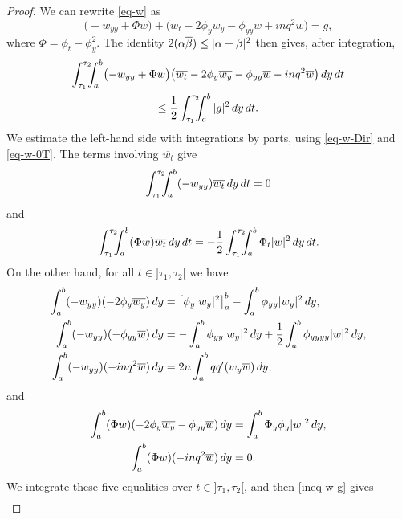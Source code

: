 \documentclass[10pt]{amsart}
\theoremstyle{plain}
\theoremstyle{definition}
\newcommand{\abs}[1]{\vert #1\vert}
\newcommand{\1}{\mathds 1}
\let\Re\relax
\DeclareMathOperator{\Re}{\mathsf{Re}\mkern2mu}
\let\Im\relax
\DeclareMathOperator{\Im}{\mathsf{Im}\mkern2mu}
\let\a\alpha
\let\b\beta
\begin{document}
\begin{proof}
We can rewrite \eqref{eq-w} as
\begin{equation*} \label{eq-g}
\bigl(- w_{yy} + \Phi w \bigr) + \bigl(w_t - 2 \phi_y w_y - \phi_{yy} w + i n q^2 w \bigr) = g,
\end{equation*}
where $\Phi = \phi_t - \phi_y^2$.
The identity $2\Re(\a\overline\b)\leq \abs{\a+\b}^2$ then gives, after integration,
\begin{multline} \label{ineq-w-g}
\Re \int_{\tau_1}^{\tau_2}\hspace*{-2mm} \int_a^b \bigl(- w_{yy} + \Phi w \bigr) \bigl(\overline{w_t} - 2 \phi_y \overline{w_y} - \phi_{yy} \overline{w} - i n q^2 \overline{w} \bigr) \, dy \, dt\\
\leq \frac 12 \int_{\tau_1}^{\tau_2}\hspace*{-2mm} \int_a^b |g|^2 \, dy \, dt.
\end{multline}
We estimate the left-hand side with integrations by parts, using \eqref{eq-w-Dir} and \eqref{eq-w-0T}. The terms involving $\overline{w_t}$ give
\[
\Re \int_{\tau_1}^{\tau_2}\hspace*{-2mm}\int_a^b (-w_{yy}) \overline{w_t} \, dy \, dt = 0
\]
and
\[
\Re \int_{\tau_1}^{\tau_2}\hspace*{-2mm} \int_a^b (\Phi w) \overline{w_t} \, dy \, dt = - \frac 1 2 \int_{\tau_1}^{\tau_2}\hspace*{-2mm} \int_a^b \Phi_t \abs{w}^2 \, dy \, dt.
\]
On the other hand, for all $t \in{}]\tau_1,\tau_2[$ we have
\begin{align*}
\Re \int_a^b (-w_{yy}) (-2 \phi_y \overline{w_{y}}) \, dy &= \big[ \phi_y \abs{w_y}^2 \big]_a^b - \int_a^b \phi_{yy} \abs{w_{y}}^2 \, dy,\\
\Re \int_a^b (-w_{yy}) (- \phi_{yy} \overline{w}) \, dy &= - \int_a^b \phi_{yy} \abs{w_{y}}^2 \, dy + \frac {1} 2 \int_a^b \phi_{yyyy} \abs{w}^2 \, dy,\\
\Re \int_a^b (-w_{yy}) (-inq^2 \overline{w}) \, dy &= 2n \int_a^b qq' \Im(w_y \overline w) \, dy,
\end{align*}
and
\begin{align*}
\Re \int_a^b (\Phi w) (-2 \phi_y \overline{w_{y}}- \phi_{yy} \overline{w}) \, dy &= \int_a^b \Phi_y \phi_y \abs w^2 \, dy,\\
\Re \int_a^b (\Phi w) (-inq^2 \overline{w}) \, dy &= 0.
\end{align*}
We integrate these five equalities over $t \in{}]\tau_1,\tau_2[$, and then \eqref{ineq-w-g} gives
\begin{multline*}

\end{multline*}
\end{proof}
\end{document}
